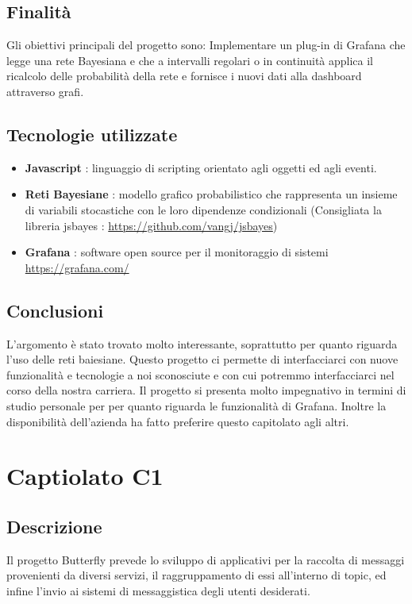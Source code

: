 \documentclass{article}
\begin{document}
        \subsection{Finalità}
            Gli obiettivi principali del progetto sono: Implementare un plug-in di Grafana che legge una rete Bayesiana e che a intervalli regolari o in continuità applica il ricalcolo delle probabilità della rete e fornisce i nuovi dati alla dashboard attraverso grafi.
        \subsection{Tecnologie utilizzate}
            \begin{itemize}
                \item \textbf{Javascript} : linguaggio di scripting orientato agli oggetti ed agli eventi.
                    \item \textbf{Reti Bayesiane} : modello grafico probabilistico che rappresenta un insieme di variabili stocastiche con le loro dipendenze condizionali (Consigliata la libreria jsbayes : \url{https://github.com/vangj/jsbayes})
                    \item \textbf{Grafana} : software open source per il monitoraggio di sistemi \url{https://grafana.com/}
            \end{itemize}
         \subsection{Conclusioni}
            L'argomento è stato trovato molto interessante, soprattutto per quanto riguarda l'uso delle reti baiesiane. Questo progetto ci permette di interfacciarci con nuove funzionalità e tecnologie a noi sconosciute e con cui potremmo interfacciarci nel corso della nostra carriera.
            Il progetto si presenta molto impegnativo in termini di studio personale per per quanto riguarda le funzionalità di Grafana.
            Inoltre la disponibilità dell'azienda ha fatto preferire questo capitolato agli altri.
\newpage

	\section{Captiolato C1}
        \subsection{Descrizione}
            Il progetto Butterfly prevede lo sviluppo di applicativi per la raccolta di messaggi provenienti da diversi servizi, il raggruppamento di essi all'interno di topic, ed infine l'invio ai sistemi di messaggistica degli utenti desiderati.
\end{document}
